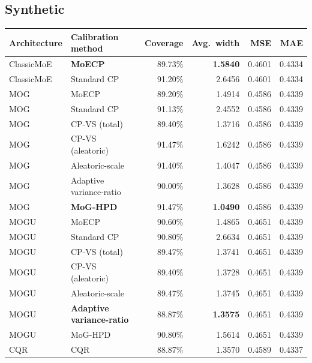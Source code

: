 \documentclass[11pt]{article}
\begin{document}
\subsection{Synthetic}
\begin{center}
\begin{tabular}{@{}llrrrr@{}}
\toprule
\textbf{Architecture} & \textbf{Calibration method} & \textbf{Coverage} & \textbf{Avg.\ width} &
\textbf{MSE} & \textbf{MAE} \\
\midrule
ClassicMoE & \textbf{MoECP}     & 89.73\% & \textbf{1.5840} & 0.4601 & 0.4334 \\
ClassicMoE & Standard CP        & 91.20\% & 2.6456 & 0.4601 & 0.4334 \\
\midrule
MOG & MoECP                     & 89.20\% & 1.4914 & 0.4586 & 0.4339 \\
MOG & Standard CP               & 91.13\% & 2.4552 & 0.4586 & 0.4339 \\
MOG & CP-VS (total)             & 89.40\% & 1.3716 & 0.4586 & 0.4339 \\
MOG & CP-VS (aleatoric)         & 91.47\% & 1.6242 & 0.4586 & 0.4339 \\
MOG & Aleatoric-scale           & 91.40\% & 1.4047 & 0.4586 & 0.4339 \\
MOG & Adaptive variance-ratio   & 90.00\% & 1.3628 & 0.4586 & 0.4339 \\
MOG & \textbf{MoG-HPD}          & 91.47\% & \textbf{1.0490} & 0.4586 & 0.4339 \\
\midrule
MOGU & MoECP                    & 90.60\% & 1.4865 & 0.4651 & 0.4339 \\
MOGU & Standard CP              & 90.80\% & 2.6634 & 0.4651 & 0.4339 \\
MOGU & CP-VS (total)            & 89.47\% & 1.3741 & 0.4651 & 0.4339 \\
MOGU & CP-VS (aleatoric)        & 89.40\% & 1.3728 & 0.4651 & 0.4339 \\
MOGU & Aleatoric-scale          & 89.47\% & 1.3745 & 0.4651 & 0.4339 \\
MOGU & \textbf{Adaptive variance-ratio} & 88.87\% & \textbf{1.3575} & 0.4651 & 0.4339 \\
MOGU & MoG-HPD                  & 90.80\% & 1.5614 & 0.4651 & 0.4339 \\
\midrule
CQR & CQR                       & 88.87\% & 1.3570 & 0.4589 & 0.4337 \\
\bottomrule
\end{tabular}
\end{center}
\end{document}
